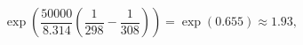 \documentclass[preview]{standalone}
\begin{document}
\[
\exp\left(\frac{50000}{8.314}\left(\frac{1}{298} - \frac{1}{308}\right)\right) = \exp(0.655) \approx 1.93,
\]
\end{document}
